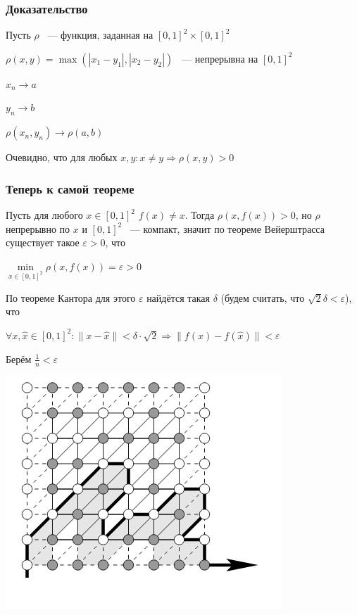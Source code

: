 \documentclass{article}
\begin{document}
        \subsubsection{Доказательство}
			
			Пусть $\rho$ ~--- функция, заданная на $[0, 1]^2 \times [0, 1]^2$
				
			$\rho(x, y) = \max \left(|x_1 - y_1|, |x_2 - y_2|\right)$ ~--- непрерывна на $[0, 1]^2$
			
			$x_n \rightarrow a$
				
			$y_n \rightarrow b$
				
			$\rho(x_n, y_n) \rightarrow \rho(a, b)$
				
			Очевидно, что для любых $x, y: x \neq y \Rightarrow \rho(x, y) > 0$
				
		\subsubsection{Теперь к самой теореме}
				
            Пусть для любого $x \in [0, 1]^2$ $f(x) \neq x$. Тогда $\rho(x, f(x)) > 0$, но $\rho$ непрерывно по $x$ и $[0, 1]^2$ ~--- компакт, значит по теореме Вейерштрасса существует такое $\varepsilon > 0$, что
				
			$\min\limits_{x \in [0, 1]^2} \rho(x, f(x)) = \varepsilon > 0$
				
			По теореме Кантора для этого $\varepsilon$ найдётся такая $\delta$ (будем считать, что $\sqrt{2} \delta < \varepsilon$), что
				
			$\forall x, \widehat{x} \in [0, 1]^2 : \| x - \widehat{x} \| < \delta \cdot \sqrt{2} \Rightarrow \| f(x) - f(\widehat{x}) \| < \varepsilon$
				
			Берём $\frac{1}{n} < \varepsilon$
				
			\includegraphics[scale=0.45]{HEXTHEOREM.png}
				
\end{document}
